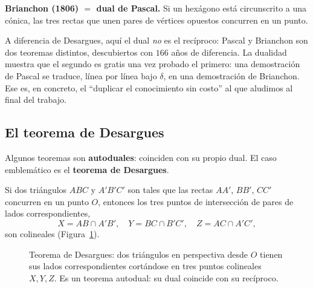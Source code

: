 \documentclass[11pt,a4paper]{article}
\begin{document}
\begin{teorema}
\textbf{Brianchon (1806) $=$ dual de Pascal.} Si un hexágono está
circunscrito a una cónica, las tres rectas que unen pares de vértices
opuestos concurren en un punto.
\end{teorema}

\noindent A diferencia de Desargues, aquí el dual \emph{no} es el
recíproco: Pascal y Brianchon son dos teoremas distintos, descubiertos
con $166$ años de diferencia. La dualidad muestra que el segundo es
gratis una vez probado el primero: una demostración de Pascal se traduce,
línea por línea bajo $\delta$, en una demostración de Brianchon. Ese es,
en concreto, el ``duplicar el conocimiento sin costo'' al que aludimos al
final del trabajo.

\subsection{El teorema de Desargues}
\label{sec:desargues}

Algunos teoremas son \textbf{autoduales}: coinciden con su propio dual. El
caso emblemático es el \textbf{teorema de Desargues}.

\begin{teorema}
Si dos triángulos $ABC$ y $A'B'C'$ son tales que las rectas $AA'$, $BB'$,
$CC'$ concurren en un punto $O$, entonces los tres puntos de intersección
de pares de lados correspondientes,
\[
  X=AB\cap A'B',\quad Y=BC\cap B'C',\quad Z=AC\cap A'C',
\]
son colineales (Figura~\ref*{fig:desargues}).
\end{teorema}

\begin{figure}[H]
\centering
{}
\caption{Teorema de Desargues: dos triángulos en perspectiva desde $O$
tienen sus lados correspondientes cortándose en tres puntos colineales
$X,Y,Z$. Es un teorema autodual: su dual coincide con su recíproco.}
\label{fig:desargues}
\end{figure}
\end{document}
